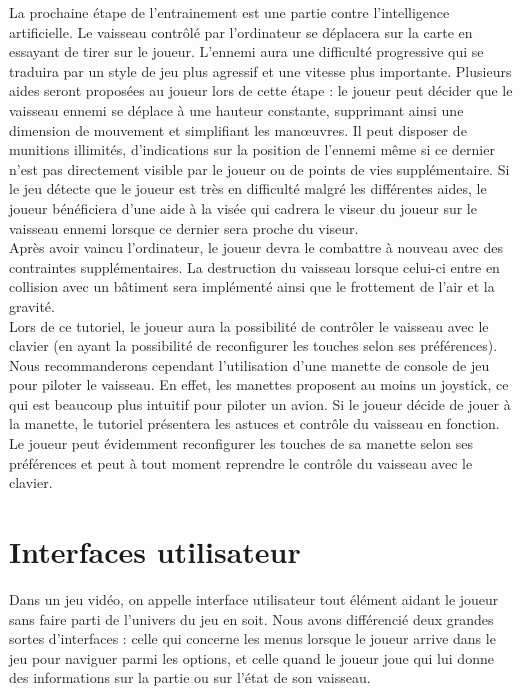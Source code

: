 \documentclass[12pt, titlepage]{article}
\begin{document}
\begin{spacing}{1.5}
 La prochaine étape de l'entrainement est une partie contre l'intelligence artificielle. Le vaisseau contrôlé par l'ordinateur se déplacera sur la carte en essayant de tirer sur le joueur. L'ennemi aura une difficulté progressive qui se traduira par un style de jeu plus agressif et une vitesse plus importante. Plusieurs aides seront proposées au joueur lors de cette étape : le joueur peut décider que le vaisseau ennemi se déplace à une hauteur constante, supprimant ainsi une dimension de mouvement et simplifiant les manœuvres. Il peut disposer de munitions illimités, d'indications sur la position de l'ennemi même si ce dernier n'est pas directement visible par le joueur ou de points de vies supplémentaire. Si le jeu détecte que le joueur est très en difficulté malgré les différentes aides, le joueur bénéficiera d'une aide à la visée qui cadrera le viseur du joueur sur le vaisseau ennemi lorsque ce dernier sera proche du viseur. \\

Après avoir vaincu l'ordinateur, le joueur devra le combattre à nouveau avec des contraintes supplémentaires. La destruction du vaisseau lorsque celui-ci entre en collision avec un bâtiment sera implémenté ainsi que le frottement de l'air et la gravité. \\

Lors de ce tutoriel, le joueur aura la possibilité de contrôler le vaisseau avec le clavier (en ayant la possibilité de reconfigurer les touches selon ses préférences). Nous recommanderons cependant l'utilisation d'une manette de console de jeu pour piloter le vaisseau. En effet, les manettes proposent au moins un joystick, ce qui est beaucoup plus intuitif pour piloter un avion. Si le joueur décide de jouer à la manette, le tutoriel présentera les astuces et contrôle du vaisseau en fonction. Le joueur peut évidemment reconfigurer les touches de sa manette selon ses préférences et peut à tout moment reprendre le contrôle du vaisseau avec le clavier.\\

\newpage
\section{Interfaces utilisateur}

Dans un jeu vidéo, on appelle interface utilisateur tout élément aidant le joueur sans faire parti de l'univers du jeu en soit. Nous avons différencié deux grandes sortes d'interfaces : celle qui concerne les menus lorsque le joueur arrive dans le jeu pour naviguer parmi les options, et celle quand le joueur joue qui lui donne des informations sur la partie ou sur l'état de son vaisseau.


\end{spacing}
\end{document}
